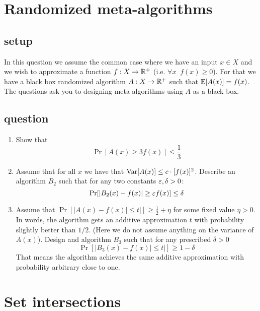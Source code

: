 \documentclass{article}
\begin{document}

\section{Randomized meta-algorithms}
\subsection*{setup}
In this question we assume the common case where we have an input $x \in X$  
and we wish to approximate a function $f:X \rightarrow {\mathbb{R}}^+$ (i.e. $\forall x\;\;f(x) \ge 0$).
For that we have a black box randomized algorithm $A:X\rightarrow {\mathbb{R}}^+$ such that ${\mathbb E}[A(x)] = f(x)$.
The questions ask you to designing meta algorithms using $A$ as a black box. 
\subsection*{question}
\begin{enumerate}
\item Show that
\[
\Pr[A(x) \ge 3f(x)] \le \frac{1}{3}
\]
\item Assume that for all $x$ we have that ${\operatorname{Var}}[A(x)] \le c\cdot [f(x)]^2$.
Describe an algorithm $B_2$ such that for any two constants $\varepsilon,\delta > 0$:
\[
\Pr[|B_2(x) - f(x)| \ge \varepsilon f(x)] \le \delta
\]
\item Assume that $\Pr[|A(x) - f(x) | \le t|] \ge \frac{1}{2}+\eta$ for some fixed value $\eta > 0$.
In words, the algorithm gets an additive approximation $t$ with probability slightly better than $1/2$.
(Here we do not assume anything on the variance of $A(x)$).
Design and algorithm $B_3$ such that for any prescribed $\delta >0$
\[
\Pr[|B_3(x) - f(x) | \le t|] \ge 1 - \delta
\]
That means the algorithm achieves the same additive approximation with probability arbitrary close to one.
\end{enumerate}


\pagebreak

\section{Set intersections} 
\end{document}
